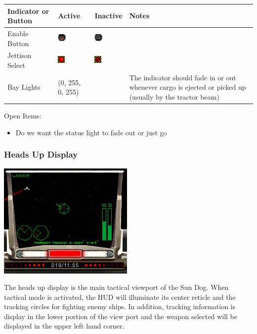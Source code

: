 \begin{tabular}{ | l | l | l | p{3.5cm} | }
\hline
Indicator or Button & Active & Inactive & Notes \\
\hline
Enable Button & \includegraphics{images/button_red_on.png} & \includegraphics{images/button_red_off.png} & \\
Jettison Select & \includegraphics{images/button_danger_on.png} & \includegraphics{images/button_danger_off.png} & \\
Bay Lights & (0, 255, 0, 255) & & The indicator should fade in or out whenever
cargo is ejected or picked up (usually by the tractor beam) \\ 
\hline
\end{tabular}

Open Items:
\begin{itemize}
\item Do we want the status light to fade out or just go 
\end{itemize}

\subsubsection{Heads Up Display}

\includegraphics[scale=0.7]{images/hud.png}

The heads up display is the main tactical viewport of the Sun Dog.  When
tactical mode is activated, the HUD will illuminate its center reticle
and the tracking circles for fighting enemy ships.  In addition, tracking
information is display in the lower portion of the view port and the
weapon selected will be displayed in the upper left hand corner.


